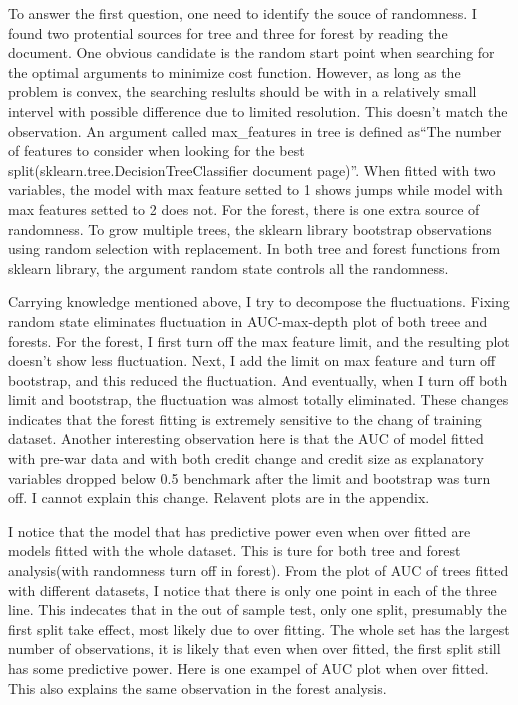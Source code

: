 \documentclass{article}
\begin{document}
To answer the first question, one need to identify the souce of
randomness. I found two protential sources for tree and three for
forest by reading the document. One obvious candidate is the random start point when searching
for the optimal arguments to minimize cost function. However, as long as
the problem is convex, the searching reslults should be with in a
relatively small intervel with possible difference due to limited resolution. This
doesn't match the observation. An argument
called max\_features in tree is defined as``The number of features to consider when
looking for the best split(sklearn.tree.DecisionTreeClassifier document
page)''. When fitted with two variables, the model with max
feature setted to 1 shows jumps while model with max features setted to 2 does not. For the forest, there is one extra
source of randomness. To grow multiple trees, the sklearn library
bootstrap observations using random selection with replacement. In both tree
and forest functions from sklearn library, the argument random state controls all the
randomness.

Carrying knowledge mentioned above, I try to decompose the fluctuations.
Fixing random state eliminates fluctuation in
AUC-max-depth plot of both treee and forests. For the forest, I first turn off the max
feature limit, and the resulting plot doesn't show less fluctuation.
Next, I add the limit on max feature and turn off bootstrap, and
this reduced the fluctuation. And eventually, when I turn off both limit
and bootstrap, the fluctuation was almost totally eliminated. These
changes indicates that the
forest fitting is extremely sensitive to the chang of training dataset.
Another interesting observation here is that the AUC of model fitted
with pre-war data and with both credit change and credit size as
explanatory variables dropped below 0.5 benchmark after the limit and
bootstrap was turn off. I cannot explain this change. Relavent plots are in the appendix.

I notice that the model that has
predictive power even when over fitted are models fitted with the whole
dataset. This is ture for both tree and forest analysis(with
randomness turn off in forest). From the plot of AUC of trees fitted
with different datasets, I notice that there is only one point in each
of the three line. This indecates that in the out of sample test, only
one split, presumably the first split take effect, most likely due to
over fitting. The whole set has the largest number of observations, it is likely that
even when over fitted, the first split still has some predictive power. Here
is one exampel of AUC plot when over fitted. This also explains the same
observation in the forest analysis.
\end{document}
